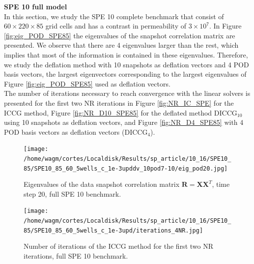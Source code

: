 \documentclass[12pt]{article}
\begin{document}
\newpage
\textbf{SPE 10 full model}\\
In this section, we study the SPE 10 complete benchmark that consist of $60\times220\times85$ grid cells and has a contrast in permeability of $3\times 10^{7}$.
In Figure \ref{fig:eig_POD_SPE85} the eigenvalues of the snapshot correlation matrix are presented. We observe that there are 4 eigenvalues larger than the rest, which implies that most of the information is contained in these eigenvalues. Therefore, we study the deflation method with 10 snapshots as deflation vectors and 4 POD basis vectors, the largest eigenvectors corresponding to the largest eigenvalues of Figure \ref{fig:eig_POD_SPE85} used as deflation vectors. \\
The number of iterations necessary to reach convergence with the linear solvers is presented for the first two NR iterations in Figure \ref{fig:NR_IC_SPE} for the ICCG method, Figure \ref{fig:NR_D10_SPE85} for the deflated method DICCG$_{10}$ using 10 snapshots as deflation vectors, and Figure \ref{fig:NR_D4_SPE85} with 4 POD basis vectors as deflation vectors (DICCG$_{4}$).

\begin{figure}[!ht]
\centering
\begin{minipage}{.4\textwidth}
 \centering
\texttt{[image: /home/wagm/cortes/Localdisk/Results/sp\_article/10\_16/SPE10\_85/SPE10\_85\_60\_5wells\_c\_1e-3upddv\_10pod7-10/eig\_pod20.jpg]}
\caption{Eigenvalues of the data snapshot correlation matrix $\mathbf{R}=\mathbf{X}\mathbf{X}^T$, time step 20, full SPE 10 benchmark.}
\label{fig:eig_POD_SPE85}
\end{minipage}%
\hspace{15mm}
\begin{minipage}{.4\textwidth}
\vspace{-0.9cm}
\hspace{-1cm}
\texttt{[image: /home/wagm/cortes/Localdisk/Results/sp\_article/10\_16/SPE10\_85/SPE10\_85\_60\_5wells\_c\_1e-3upd/iterations\_4NR.jpg]}
\vspace{-1.3cm}
\caption{Number of iterations of the ICCG method for the first two NR iterations, full SPE 10 benchmark.}
\label{fig:NR_IC_SPE85}
\end{minipage}
\end{figure}
\end{document}
